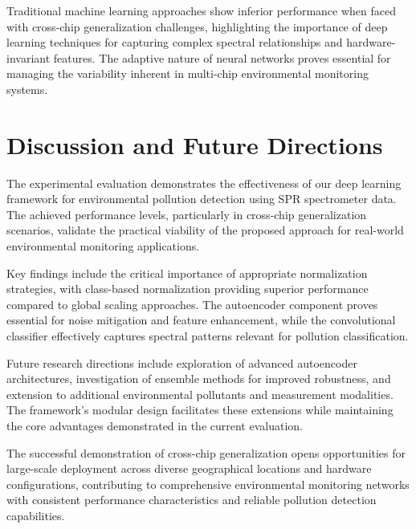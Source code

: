 Traditional machine learning approaches show inferior performance when faced with cross-chip generalization challenges, highlighting the importance of deep learning techniques for capturing complex spectral relationships and hardware-invariant features. The adaptive nature of neural networks proves essential for managing the variability inherent in multi-chip environmental monitoring systems.

\section{Discussion and Future Directions}
\label{sec:discussion_future}

The experimental evaluation demonstrates the effectiveness of our deep learning framework for environmental pollution detection using SPR spectrometer data. The achieved performance levels, particularly in cross-chip generalization scenarios, validate the practical viability of the proposed approach for real-world environmental monitoring applications.

Key findings include the critical importance of appropriate normalization strategies, with class-based normalization providing superior performance compared to global scaling approaches. The autoencoder component proves essential for noise mitigation and feature enhancement, while the convolutional classifier effectively captures spectral patterns relevant for pollution classification.

Future research directions include exploration of advanced autoencoder architectures, investigation of ensemble methods for improved robustness, and extension to additional environmental pollutants and measurement modalities. The framework's modular design facilitates these extensions while maintaining the core advantages demonstrated in the current evaluation.

The successful demonstration of cross-chip generalization opens opportunities for large-scale deployment across diverse geographical locations and hardware configurations, contributing to comprehensive environmental monitoring networks with consistent performance characteristics and reliable pollution detection capabilities.